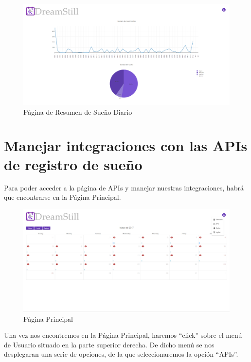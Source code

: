 \documentclass[11pt,openany]{book}
\begin{document}
\begin{figure}[H]
\centering
\includegraphics[totalheight=6cm]{manualUsuario/resumenSue_oDiario.png}
\caption{Página de Resumen de Sueño Diario}
\end{figure}

\section{Manejar integraciones con las APIs de registro de sueño}

Para poder acceder a la página de APIs y manejar nuestras integraciones, habrá que encontrarse en la Página Principal.

\begin{figure}[H]
\centering
\includegraphics[totalheight=6cm]{manualUsuario/paginaPrincipal.png}
\caption{Página Principal}
\end{figure}

Una vez nos encontremos en la Página Principal, haremos ``click'' sobre el menú de Usuario situado en la parte superior derecha. De dicho menú se nos desplegaran una serie de opciones, de la que seleccionaremos la opción ``APIs''.
\end{document}
